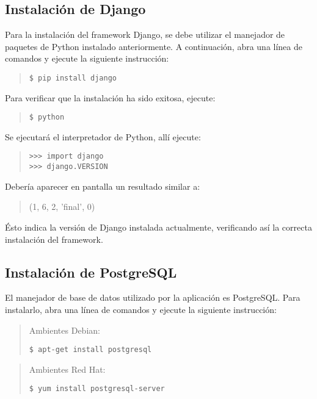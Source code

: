 \documentclass[12pt,a4paper]{article}
\begin{document}
\subsection{Instalación de Django}
Para la instalación del framework Django, se debe utilizar el manejador de paquetes de Python instalado anteriormente. A continuación, abra una línea de comandos y ejecute la siguiente instrucción:

\begin{quote}
\begin{verbatim}
$ pip install django
\end{verbatim}
\end{quote}

Para verificar que la instalación ha sido exitosa, ejecute:

\begin{quote}
\begin{verbatim}
$ python
\end{verbatim}
\end{quote}

Se ejecutará el interpretador de Python, allí ejecute:

\begin{quote}
\begin{verbatim}
>>> import django
>>> django.VERSION
\end{verbatim}
\end{quote}

Debería aparecer en pantalla un resultado similar a:

\begin{quote}
(1, 6, 2, 'final', 0)
\end{quote}

Ésto indica la versión de Django instalada actualmente, verificando así la correcta instalación del framework.

\subsection{Instalación de PostgreSQL}
El manejador de base de datos utilizado por la aplicación es PostgreSQL. Para instalarlo, abra una línea de comandos y ejecute la siguiente instrucción:

\begin{quote}
Ambientes Debian:
\begin{verbatim}
$ apt-get install postgresql
\end{verbatim}
\end{quote}

\begin{quote}
Ambientes Red Hat:
\begin{verbatim}
$ yum install postgresql-server
\end{verbatim}
\end{quote}
\end{document}
